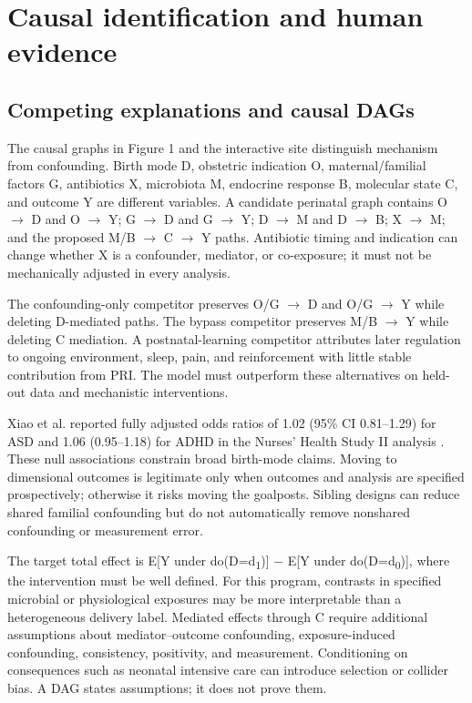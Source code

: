 \section{Causal identification and human evidence}

\subsection{Competing explanations and causal DAGs}

The causal graphs in Figure 1 and the interactive site distinguish mechanism from confounding. Birth mode D, obstetric indication O, maternal/familial factors G, antibiotics X, microbiota M, endocrine response B, molecular state C, and outcome Y are different variables. A candidate perinatal graph contains O \ensuremath{\rightarrow} D and O \ensuremath{\rightarrow} Y; G \ensuremath{\rightarrow} D and G \ensuremath{\rightarrow} Y; D \ensuremath{\rightarrow} M and D \ensuremath{\rightarrow} B; X \ensuremath{\rightarrow} M; and the proposed M/B \ensuremath{\rightarrow} C \ensuremath{\rightarrow} Y paths. Antibiotic timing and indication can change whether X is a confounder, mediator, or co-exposure; it must not be mechanically adjusted in every analysis.

The confounding-only competitor preserves O/G \ensuremath{\rightarrow} D and O/G \ensuremath{\rightarrow} Y while deleting D-mediated paths. The bypass competitor preserves M/B \ensuremath{\rightarrow} Y while deleting C mediation. A postnatal-learning competitor attributes later regulation to ongoing environment, sleep, pain, and reinforcement with little stable contribution from PRI. The model must outperform these alternatives on held-out data and mechanistic interventions.

Xiao et al. reported fully adjusted odds ratios of 1.02 (95\% CI 0.81–1.29) for ASD and 1.06 (0.95–1.18) for ADHD in the Nurses' Health Study II analysis \cite{ref19}. These null associations constrain broad birth-mode claims. Moving to dimensional outcomes is legitimate only when outcomes and analysis are specified prospectively; otherwise it risks moving the goalposts. Sibling designs can reduce shared familial confounding but do not automatically remove nonshared confounding or measurement error.

The target total effect is E[Y under do(D=d\textsubscript{1})] − E[Y under do(D=d\textsubscript{0})], where the intervention must be well defined. For this program, contrasts in specified microbial or physiological exposures may be more interpretable than a heterogeneous delivery label. Mediated effects through C require additional assumptions about mediator–outcome confounding, exposure-induced confounding, consistency, positivity, and measurement. Conditioning on consequences such as neonatal intensive care can introduce selection or collider bias. A DAG states assumptions; it does not prove them.


